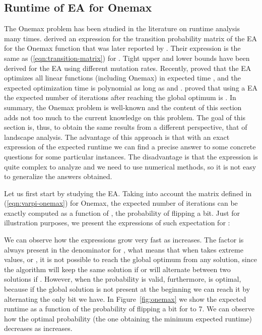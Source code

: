 \documentclass{article}
\begin{document}
\subsection{Runtime of  EA for Onemax}

The Onemax problem has been studied in the literature on runtime analysis many times. \cite{Garnier1999} derived an expression for the transition probability matrix of the  EA for the Onemax function that was later reported by \cite{He:Yao2003}. Their expression is the same as (\ref{eqn:transition-matrix}) for . Tight upper and lower bounds have been derived for the  EA using different mutation rates. 
Recently, \citet{Witt2013tight} proved that the  EA optimizes all linear functions (including Onemax) in expected time , and the expected optimization time is polynomial as long as  and . \citet{Jansen2005} proved that using a  EA the expected number of iterations after reaching the global optimum is .
In summary, the Onemax problem is well-known and the content of this section adds not too much to the current knowledge on this problem. The goal of this section is, thus, to obtain the same results from a different perspective, that of landscape analysis. The advantage of this approach is that with an exact expression of the expected runtime we can find a precise answer to some concrete questions for some particular instances. The disadvantage is that the expression is quite complex to analyze and we need to use numerical methods, so it is not easy to generalize the answers obtained. 


Let us first start by studying the  EA. Taking into account the  matrix defined in (\ref{eqn:varpi-onemax}) for Onemax, the expected number of iterations can be exactly computed as a function of , the probability of flipping a bit. Just for illustration purposes, we present the expressions of such expectation for :


We can observe how the expressions grow very fast as  increases. The factor  is always present in the denominator for , what means that when  takes extreme values,  or , it is not possible to reach the global optimum from any solution, since the algorithm will keep the same solution if  or will alternate between two solutions if . However, when  the probability  is valid, furthermore, is optimal, because if the global solution is not present at the beginning we can reach it by alternating the only bit we have. In Figure~\ref{fig:onemax} we show the expected runtime as a function of the probability of flipping a bit for  to 7. We can observe how the optimal probability (the one obtaining the minimum expected runtime) decreases as  increases.
\end{document}
